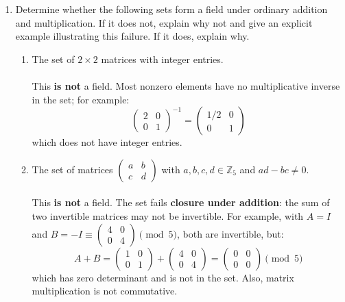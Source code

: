 \documentclass{article}
\newcommand{\Zn}[1]{\mathbb{Z}_{#1}}
\begin{document}
\begin{enumerate}
\begin{enumerate}
        \end{enumerate}

        \item Determine whether the following sets form a field under ordinary addition and multiplication. If it does not, explain why not and give an explicit example illustrating this failure. If it does, explain why.
        \begin{enumerate}

            \item The set of $2 \times 2$ matrices with integer entries.
            \\
            \\ This \textbf{is not} a field. Most nonzero elements have no multiplicative inverse in the set; for example:
            \[
                \begin{pmatrix}2&0\\0&1\end{pmatrix}^{-1} = \begin{pmatrix}1/2&0\\0&1\end{pmatrix}
            \]
            which does not have integer entries.

            \item The set of matrices $\begin{pmatrix}a&b\\c&d\end{pmatrix}$ with $a,b,c,d \in \Zn{5}$ and $ad-bc \neq 0$.
            \\
            \\ This \textbf{is not} a field. The set fails \textbf{closure under addition}: the sum of two invertible matrices may not be invertible. For example, with $A=I$ and $B=-I \equiv \begin{pmatrix}4&0\\0&4\end{pmatrix}\pmod{5}$, both are invertible, but:
            \[
                A + B = \begin{pmatrix}1&0\\0&1\end{pmatrix}+\begin{pmatrix}4&0\\0&4\end{pmatrix}
                = \begin{pmatrix}0&0\\0&0\end{pmatrix} \pmod{5}
            \]
            which has zero determinant and is not in the set. Also, matrix multiplication is not commutative.


\end{enumerate}
\end{enumerate}
\end{document}
